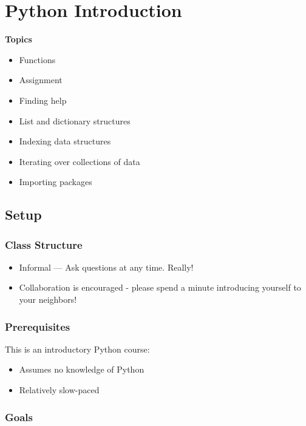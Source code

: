 \documentclass[]{book}
\providecommand{\tightlist}{%
  \setlength{\itemsep}{0pt}\setlength{\parskip}{0pt}}
\begin{document}
\chapter{Python Introduction}\label{python-introduction}

\textbf{Topics}

\begin{itemize}
\tightlist
\item
  Functions
\item
  Assignment
\item
  Finding help
\item
  List and dictionary structures
\item
  Indexing data structures
\item
  Iterating over collections of data
\item
  Importing packages
\end{itemize}

\section{Setup}\label{setup-4}

\subsection{Class Structure}\label{class-structure-4}

\begin{itemize}
\tightlist
\item
  Informal --- Ask questions at any time. Really!
\item
  Collaboration is encouraged - please spend a minute introducing
  yourself to your neighbors!
\end{itemize}

\subsection{Prerequisites}\label{prerequisites-4}

This is an introductory Python course:

\begin{itemize}
\tightlist
\item
  Assumes no knowledge of Python
\item
  Relatively slow-paced
\end{itemize}

\subsection{Goals}\label{goals-2}
\end{document}
